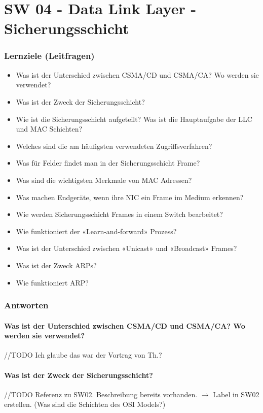 \part{SW 04 - Data Link Layer - Sicherungsschicht}\label{part:sw04}
\section{Lernziele (Leitfragen)}
\begin{itemize}
    \item Was ist der Unterschied zwischen CSMA/CD und CSMA/CA? Wo werden sie verwendet?
    \item Was ist der Zweck der Sicherungsschicht?
    \item Wie ist die Sicherungsschicht aufgeteilt? Was ist die Hauptaufgabe der LLC und MAC Schichten?
    \item Welches sind die am häufigsten verwendeten Zugriffsverfahren?
    \item Was für Felder findet man in der Sicherungsschicht Frame?
    \item Was sind die wichtigsten Merkmale von MAC Adressen?
    \item Was machen Endgeräte, wenn ihre NIC ein Frame im Medium erkennen?
    \item Wie werden Sicherungsschicht Frames in einem Switch bearbeitet?
    \item Wie funktioniert der «Learn-and-forward» Prozess?
    \item Was ist der Unterschied zwischen «Unicast» und «Broadcast» Frames?
    \item Was ist der Zweck ARPs?
    \item Wie funktioniert ARP?
\end{itemize}

\section{Antworten}
\subsection*{Was ist der Unterschied zwischen CSMA/CD und CSMA/CA? Wo werden sie verwendet?}\label{sub:csma}
//TODO Ich glaube das war der Vortrag von Th.?

\subsection*{Was ist der Zweck der Sicherungsschicht?}
//TODO Referenz zu SW02. Beschreibung bereits vorhanden. $\rightarrow$ Label in SW02 erstellen. (Was sind die Schichten des OSI Models?)

